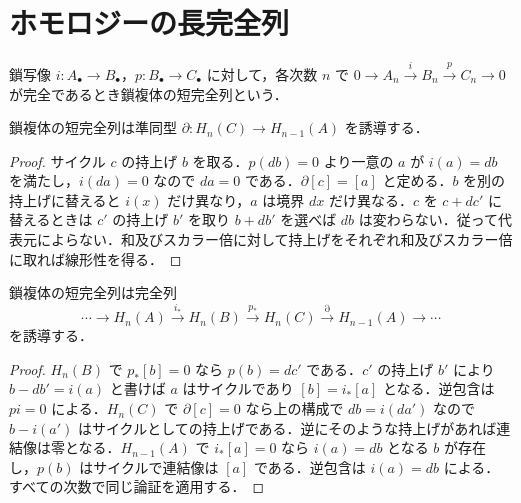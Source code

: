 \section{ホモロジーの長完全列}
\begin{defn}[鎖複体の短完全列]
鎖写像 $i:A_\bullet\to B_\bullet$，$p:B_\bullet\to C_\bullet$ に対して，各次数 $n$ で $0\to A_n\xrightarrow i B_n\xrightarrow p C_n\to0$ が完全であるとき鎖複体の短完全列という．
\end{defn}
\begin{prop}[連結準同型]
鎖複体の短完全列は準同型 $\partial:H_n(C)\to H_{n-1}(A)$ を誘導する．
\end{prop}
\begin{proof}
サイクル $c$ の持上げ $b$ を取る．$p(db)=0$ より一意の $a$ が $i(a)=db$ を満たし，$i(da)=0$ なので $da=0$ である．$\partial[c]=[a]$ と定める．$b$ を別の持上げに替えると $i(x)$ だけ異なり，$a$ は境界 $dx$ だけ異なる．$c$ を $c+dc'$ に替えるときは $c'$ の持上げ $b'$ を取り $b+db'$ を選べば $db$ は変わらない．従って代表元によらない．和及びスカラー倍に対して持上げをそれぞれ和及びスカラー倍に取れば線形性を得る．
\end{proof}
\begin{prop}[ホモロジーの長完全列]
鎖複体の短完全列は完全列
\[
\cdots\to H_n(A)\xrightarrow{i_*}H_n(B)\xrightarrow{p_*}H_n(C)
\xrightarrow{\partial}H_{n-1}(A)\to\cdots
\]
を誘導する．
\end{prop}
\begin{proof}
$H_n(B)$ で $p_*[b]=0$ なら $p(b)=dc'$ である．$c'$ の持上げ $b'$ により $b-db'=i(a)$ と書けば $a$ はサイクルであり $[b]=i_*[a]$ となる．逆包含は $pi=0$ による．$H_n(C)$ で $\partial[c]=0$ なら上の構成で $db=i(da')$ なので $b-i(a')$ はサイクルとしての持上げである．逆にそのような持上げがあれば連結像は零となる．$H_{n-1}(A)$ で $i_*[a]=0$ なら $i(a)=db$ となる $b$ が存在し，$p(b)$ はサイクルで連結像は $[a]$ である．逆包含は $i(a)=db$ による．すべての次数で同じ論証を適用する．
\end{proof}
